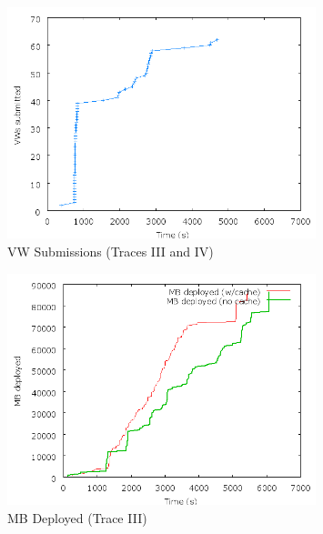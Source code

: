\documentclass[singlespace]{ccw_chithesis}
\begin{document}
\begin{figure}
  \begin{center}
    \includegraphics[width=0.8\textwidth]{figures/ProviderPerspective-TraceShape.png}
    \caption{VW Submissions (Traces III and IV)}
	\label{fig:providershape}
  \end{center}
\end{figure}

\begin{figure}
  \begin{center}
    \includegraphics[width=0.8\textwidth]{figures/ProviderPerspective-Uniform2.png}
    \caption{MB Deployed (Trace III)}
	\label{fig:providerIII}
  \end{center}
\end{figure}
\end{document}
